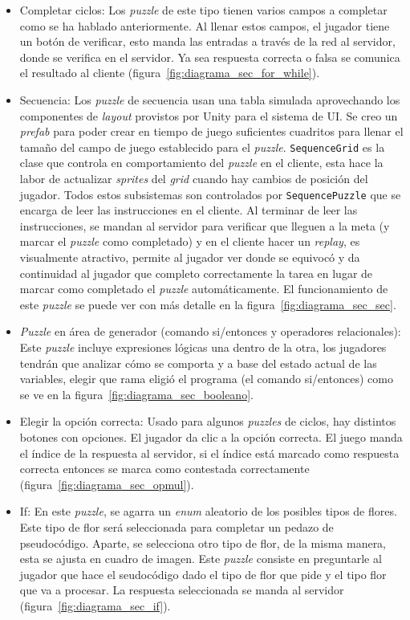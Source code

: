 \begin{itemize}
    \item Completar ciclos: Los \textit{puzzle} de este tipo tienen varios campos a completar como se ha hablado anteriormente. Al llenar estos campos, el jugador tiene un botón de verificar, esto manda las entradas a través de la red al servidor, donde se verifica en el servidor. Ya sea respuesta correcta o falsa se comunica el resultado al cliente (figura~\ref{fig:diagrama_sec_for_while}).
    \item Secuencia: Los \textit{puzzle} de secuencia usan una tabla simulada aprovechando los componentes de \textit{layout} provistos por Unity para el sistema de UI. Se creo un \textit{prefab} para poder crear en tiempo de juego suficientes cuadritos para llenar el tamaño del campo de juego establecido para el \textit{puzzle}. \texttt{SequenceGrid} es la clase que controla en comportamiento del \textit{puzzle} en el cliente, esta hace la labor de actualizar \textit{sprites} del \textit{grid} cuando hay cambios de posición del jugador. Todos estos subsistemas son controlados por \texttt{SequencePuzzle} que se encarga de leer las instrucciones en el cliente. Al terminar de leer las instrucciones, se mandan al servidor para verificar que lleguen a la meta (y marcar el \textit{puzzle} como completado) y en el cliente hacer un \textit{replay}, es visualmente atractivo, permite al jugador ver donde se equivocó y da continuidad al jugador que completo correctamente la tarea en lugar de marcar como completado el \textit{puzzle} automáticamente. El funcionamiento de este \textit{puzzle} se puede ver con más detalle en la figura~\ref{fig:diagrama_sec_sec}.
    \item  \textit{Puzzle} en área de generador (comando si/entonces y operadores relacionales): Este \textit{puzzle} incluye expresiones lógicas una dentro de la otra, los jugadores tendrán que analizar cómo se comporta y a base del estado actual de las variables, elegir que rama eligió el programa (el comando si/entonces) como se ve en la figura~\ref{fig:diagrama_sec_booleano}.
    \item Elegir la opción correcta: Usado para algunos \textit{puzzles} de ciclos, hay distintos botones con opciones. El jugador da clic a la opción correcta. El juego manda el índice de la respuesta al servidor, si el índice está marcado como respuesta correcta entonces se marca como contestada correctamente (figura~\ref{fig:diagrama_sec_opmul}).
    \item If: En este \textit{puzzle}, se agarra un \textit{enum} aleatorio de los posibles tipos de flores. Este tipo de flor será seleccionada para completar un pedazo de pseudocódigo. Aparte, se selecciona otro tipo de flor, de la misma manera, esta se ajusta en cuadro de imagen. Este \textit{puzzle} consiste en preguntarle al jugador que hace el seudocódigo dado el tipo de flor que pide y el tipo flor que va a procesar. La respuesta seleccionada se manda al servidor (figura~\ref{fig:diagrama_sec_if}).

\end{itemize}
